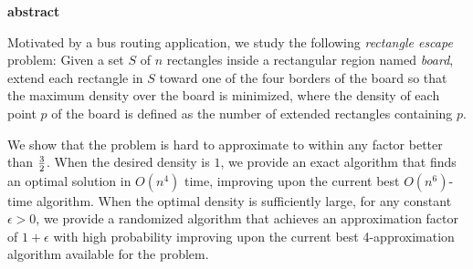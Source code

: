 

\pagestyle{empty}

\begin{latin}

\EnglishAbstractFont

\begin{center}
\textbf{abstract}
\end{center}

Motivated by a bus routing application, 
we study the following \emph{rectangle escape} problem: 
Given a set $S$ of $n$ rectangles inside a rectangular region named \emph{board}, extend each rectangle in $S$ toward one of the four borders of the board so that the maximum density over the board is minimized, 
where the density of each point $p$ of the board is defined as the number of extended rectangles containing $p$.

We show that the problem is hard to approximate to within any factor better than ${{3} \over {2}}$. 
When the desired density is $1$, we provide an exact algorithm that finds an optimal solution in $O(n^4)$ time, 
improving upon the current best $O(n^6)$-time algorithm. 
When the optimal density is sufficiently large, 
for any constant $\epsilon > 0$, we provide a randomized algorithm that achieves an approximation factor of $1 + \epsilon$ with high probability improving upon the current best 4-approximation algorithm available for the problem.

\end{latin}

\newpage

